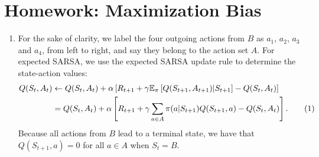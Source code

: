 \documentclass{article}
\newcommand\numberthis{\addtocounter{equation}{1}\tag{\theequation}}
\begin{document}
\section*{Homework: Maximization Bias}
\begin{enumerate}
	\item For the sake of clarity, we label the four outgoing actions from $B$ as $a_1$, $a_2$, $a_3$
	      and $a_4$, from left to right, and say they belong to the action set $A$. For expected
	      SARSA, we use the expected SARSA update rule to determine the state-action values:
	      \begin{align*}
		      Q(S_t, A_t) & \leftarrow Q(S_t, A_t) + \alpha \left[ R_{t+1} + \gamma \mathbb{E}_\pi
		      \left[Q(S_{t+1}, A_{t+1})|S_{t+1}\right]  - Q(S_t, A_t) \right]                            \\
		                  & = Q(S_t, A_t) + \alpha \left[ R_{t+1} + \gamma \sum_{a \in A} \pi(a|S_{t+1})
			      Q(S_{t+1}, a) - Q(S_t, A_t) \right]. \numberthis \label{eq:expected_sarsa_update}
	      \end{align*}
	      Because all actions from $B$ lead to a terminal state, we have that $Q(S_{t+1}, a) = 0$ for
	      all $a \in A$ when $S_t = B$.


\end{enumerate}
\end{document}
